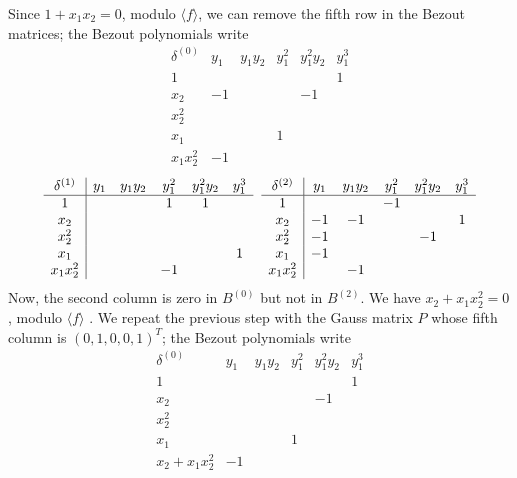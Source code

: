 \documentclass{standalone}
\begin{document}
Since $1 + x_1x_2 = 0$, modulo $\langle f \rangle$, we can remove the fifth row in the Bezout matrices; the Bezout polynomials write
$$
\begin{array}{c|ccccc}
	\delta^{(0)} & y_1 & y_1y_2 & y_1^2 & y_1^2y_2 & y_1^3 \\
	\hline
	1  &  &  &  &  & 1 \\
	x_2  & -1 &  &  & -1 & \\
	x_2^2  &  &  &  &  & \\
	x_1  &  &  & 1 &  & \\
	x_1x_2^2  & -1 &  &  &  &
\end{array}$$
$$
\begin{array}{c|ccccc}
	\delta^{(1)}  & y_1 & y_1y_2 & y_1^2 & y_1^2y_2 & y_1^3 \\
	\hline
	1  &  &  & 1 & 1 & \\
	x_2  &  &  &  &  & \\
	x_2^2  &  &  &  &  & \\
	x_1  &  &  &  &  & 1 \\
	x_1x_2^2  &  &  & -1 &  &
\end{array}
\hspace{0.2cm}
\begin{array}{c|ccccc}
	\delta^{(2)} & y_1 & y_1y_2 & y_1^2 & y_1^2y_2 & y_1^3 \\
	\hline
	1  &  &  & -1 &  & \\
	x_2  & -1 & -1 &  &  & 1 \\
	x_2^2  & -1 &  &  & -1 & \\
	x_1  & -1 &  &  &  & \\
	x_1x_2^2 &  & -1 &  &  &
\end{array}
$$
Now, the second column is zero in $B^{(0)}$ but not in $B^{(2)}$. We have $x_2 + x_1x_2^{2} = 0$, modulo $\langle f \rangle$ . We repeat the previous step with the Gauss matrix $P$ whose fifth column is $(0, 1, 0, 0, 1)^{T}$; the Bezout polynomials write
$$
\begin{array}{c|ccccc}
	\delta^{(0)} & y_1 & y_1y_2 & y_1^2 & y_1^2y_2 & y_1^3 \\
	\hline
	1  &  &  &  &  & 1 \\
	x_2  &  &  &  & -1 & \\
	x_2^2  &  &  &  &  & \\
	x_1  &  &  & 1 &  & \\
	x_2 + x_1x_2^2  & -1 &  &  &  &
\end{array}$$
\end{document}
